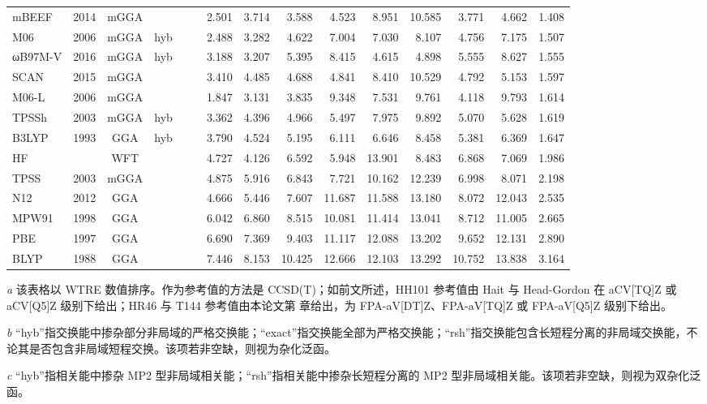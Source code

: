 \begin{landscape}
\begin{longtable}[c]{lcccccrrrrrrrrc}
mBEEF            & 2014 & mGGA &     &     &     & 2.501 & 3.714 & 3.588  & 4.523  & 8.951  & 10.585 & 3.771  & 4.662  & 1.408 \\
M06              & 2006 & mGGA & hyb &     &     & 2.488 & 3.282 & 4.622  & 7.004  & 7.030  & 8.107  & 4.756  & 7.175  & 1.507 \\
ωB97M-V          & 2016 & mGGA & hyb &     &     & 3.188 & 3.207 & 5.395  & 8.415  & 4.615  & 4.898  & 5.555  & 8.627  & 1.555 \\
SCAN             & 2015 & mGGA &     &     &     & 3.410 & 4.485 & 4.688  & 4.841  & 8.410  & 10.529 & 4.792  & 5.153  & 1.597 \\
M06-L            & 2006 & mGGA &     &     &     & 1.847 & 3.131 & 3.835  & 9.348  & 7.531  & 9.761  & 4.118  & 9.793  & 1.614 \\
TPSSh            & 2003 & mGGA & hyb &     &     & 3.362 & 4.396 & 4.966  & 5.497  & 7.975  & 9.892  & 5.070  & 5.628  & 1.619 \\
B3LYP            & 1993 & GGA  & hyb &     &     & 3.790 & 4.524 & 5.195  & 6.111  & 6.646  & 8.458  & 5.381  & 6.369  & 1.647 \\
HF               &      & WFT  &     &     &     & 4.727 & 4.126 & 6.592  & 5.948  & 13.901 & 8.483  & 6.868  & 7.069  & 1.986 \\
TPSS             & 2003 & mGGA &     &     &     & 4.875 & 5.916 & 6.843  & 7.721  & 10.162 & 12.239 & 6.998  & 8.071  & 2.198 \\
N12              & 2012 & GGA  &     &     &     & 4.666 & 5.446 & 7.607  & 11.687 & 11.588 & 13.180 & 8.072  & 12.043 & 2.535 \\
MPW91            & 1998 & GGA  &     &     &     & 6.042 & 6.860 & 8.515  & 10.081 & 11.414 & 13.041 & 8.712  & 11.005 & 2.665 \\
PBE              & 1997 & GGA  &     &     &     & 6.690 & 7.369 & 9.403  & 11.117 & 12.088 & 13.202 & 9.652  & 12.131 & 2.890 \\
BLYP             & 1988 & GGA  &     &     &     & 7.446 & 8.153 & 10.425 & 12.666 & 12.103 & 13.292 & 10.752 & 13.838 & 3.164
\end{longtable}
\vspace{-1em}
\footnotesize
\par\noindent\emph{a} 该表格以 WTRE 数值排序。作为参考值的方法是 CCSD(T)；如前文所述，HH101 参考值由 Hait 与 Head-Gordon 在 aCV[TQ]Z 或 aCV[Q5]Z 级别下给出\cite{Hait-Head-Gordon.PCCP.2018}；HR46 与 T144 参考值由本论文第  章给出，为 FPA-aV[DT]Z、FPA-aV[TQ]Z 或 FPA-aV[Q5]Z 级别下给出。
\par\noindent\emph{b} “hyb”指交换能中掺杂部分非局域的严格交换能；“exact”指交换能全部为严格交换能；“rsh”指交换能包含长短程分离的非局域交换能，不论其是否包含非局域短程交换。该项若非空缺，则视为杂化泛函。
\par\noindent\emph{c} “hyb”指相关能中掺杂 MP2 型非局域相关能；“rsh”指相关能中掺杂长短程分离的 MP2 型非局域相关能。该项若非空缺，则视为双杂化泛函。
\end{landscape}

\endgroup
